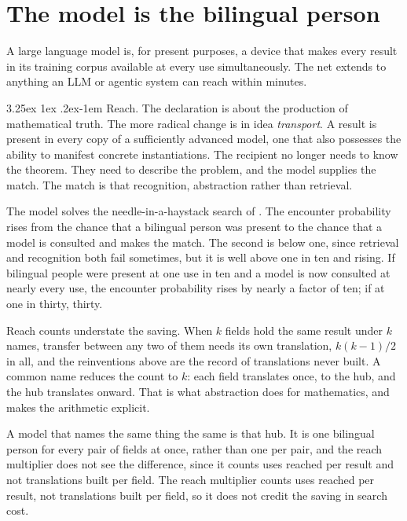 \documentclass[11pt]{article}
\makeatletter
\renewcommand\paragraph{\@startsection{paragraph}{4}{\z@}%
  {3.25ex \@plus1ex \@minus.2ex}{-1em}%
  {\normalfont\normalsize\itshape}}
\theoremstyle{definition}
\theoremstyle{remark}
\makeatother
\begin{document}
\section{The model is the bilingual person}

A large language model is, for present purposes, a device that makes every result in its training corpus available at every use simultaneously. The net extends to anything an LLM or agentic system can reach within minutes.

\paragraph{Reach.}  The declaration is about the production of mathematical truth. The more radical change is in idea {\em transport}.
A result is present in every copy of a sufficiently advanced model, one that also possesses the ability to manifest concrete instantiations. The recipient no longer needs to know the theorem. They need to describe the problem, and the model supplies the match. The match is that recognition, abstraction rather than retrieval.

The model solves the needle-in-a-haystack search of \citet{agrawal2019}. The encounter probability rises from the chance that a bilingual person was present to the chance that a model is consulted and makes the match. The second is below one, since retrieval and recognition both fail sometimes, but it is well above one in ten and rising. If bilingual people were present at one use in ten and a model is now consulted at nearly every use, the encounter probability rises by nearly a factor of ten; if at one in thirty, thirty.

Reach counts understate the saving. When $k$ fields hold the same result under $k$ names, transfer between any two of them needs its own translation, $k(k-1)/2$ in all, and the reinventions above are the record of translations never built. A common name reduces the count to $k$: each field translates once, to the hub, and the hub translates onward. That is what abstraction does for mathematics, and \citet{cotton2026protocol} makes the arithmetic explicit.

A model that names the same thing the same is that hub. It is one bilingual person for every pair of fields at once, rather than one per pair, and the reach multiplier does not see the difference, since it counts uses reached per result and not translations built per field. The reach multiplier counts uses reached per result, not translations built per field, so it does not credit the saving in search cost.
\end{document}
